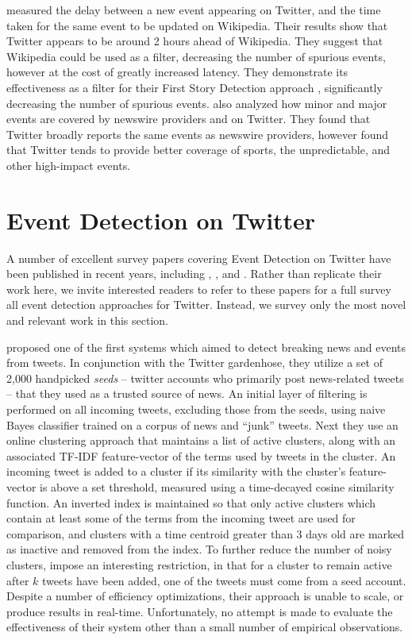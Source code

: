 \cite{WRN2012:osbornebieber} measured the delay between a new event appearing on Twitter, and the time taken for the same event to be updated on Wikipedia. Their results show that Twitter appears to be around 2 hours ahead of Wikipedia.
They suggest that Wikipedia could be used as a filter, decreasing the number of spurious events, however at the cost of greatly increased latency. They demonstrate its effectiveness as a filter for their First Story Detection approach \citep{Petrovic:2010:SFS:1857999.1858020}, significantly decreasing the number of spurious events.
\cite{ICWSM136066} also analyzed how minor and major events are covered by newswire providers and on Twitter. They found that Twitter broadly reports the same events as newswire providers, however found that Twitter tends to provide better coverage of sports, the unpredictable, and other high-impact events.

\section{Event Detection on Twitter}
A number of excellent survey papers covering Event Detection on Twitter have been published in recent years, including \cite{Hasan17}, \cite{Goswami2016}, and \cite{Atefeh2015}. Rather than replicate their work here, we invite interested readers to refer to these papers for a full survey all event detection approaches for Twitter.
Instead, we survey only the most novel and relevant work in this section.

\cite{sankaranarayanan2009twitterstand} proposed one of the first systems which aimed to detect breaking news and events from tweets.
In conjunction with the Twitter gardenhose, they utilize a set of 2,000 handpicked \emph{seeds} -- twitter accounts who primarily post news-related tweets -- that they used as a trusted source of news.
An initial layer of filtering is performed on all incoming tweets, excluding those from the seeds, using naive Bayes classifier trained on a corpus of news and ``junk'' tweets.
Next they use an online clustering approach that maintains a list of active clusters, along with an associated TF-IDF \citep{Salton:1988:TAA:54259.54260} feature-vector of the terms used by tweets in the cluster.
An incoming tweet is added to a cluster if its similarity with the cluster's feature-vector is above a set threshold, measured using a time-decayed cosine similarity function.
An inverted index is maintained so that only active clusters which contain at least some of the terms from the incoming tweet are used for comparison, and clusters with a time centroid greater than 3 days old are marked as inactive and removed from the index.
To further reduce the number of noisy clusters, \cite{sankaranarayanan2009twitterstand} impose an interesting restriction, in that for a cluster to remain active after \(k\) tweets have been added, one of the tweets must come from a seed account.
Despite a number of efficiency optimizations, their approach is unable to scale, or produce results in real-time.
Unfortunately, no attempt is made to evaluate the effectiveness of their system other than a small number of empirical observations.

